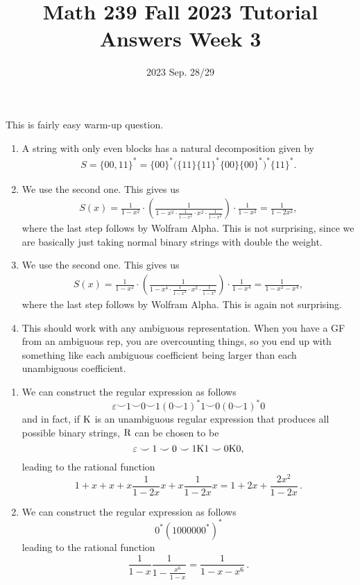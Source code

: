 \title{Math 239 Fall 2023 Tutorial Answers Week 3}

\date{2023 Sep. 28/29}
\maketitle

\begin{enumerate}
     This is fairly easy warm-up question.
    \begin{enumerate}
        \item A string with only even blocks has a natural decomposition given by
        \begin{align*}
            S = \{ 00, 11\}^* = \{ 00\}^* \big( \{ 11\} \{11\}^* \{ 00 \} \{ 00 \}^*  \big)^* \{11\}^*.
        \end{align*}
        \item We use the second one. This gives us
        \begin{align*}
            S(x) = \frac{1}{1-x^2} \cdot \left( \frac{1}{1- x^2 \cdot \frac{1}{1-x^2} \cdot x^2 \cdot \frac{1}{1-x^2}} \right) \cdot \frac{1}{1-x^2} = \frac{1}{1-2x^2},
        \end{align*}
        where the last step follows by Wolfram Alpha. This is not surprising, since we are basically just taking normal binary strings with double the weight.
        \item We use the second one. This gives us
        \begin{align*}
            S(x) = \frac{1}{1-x^2} \cdot \left( \frac{1}{1 - x^4 \cdot \frac{1}{1-x^4} \cdot x^2 \cdot \frac{1}{1-x^2}} \right) \cdot \frac{1}{1-x^4} = \frac{1}{1-x^2-x^4},
        \end{align*}
        where the last step follows by Wolfram Alpha. This is again not surprising.
        \item This should work with any ambiguous representation. When you have a GF from an ambiguous rep, you are overcounting things, so you end up with something like each ambiguous coefficient being larger than each unambiguous coefficient.
    \end{enumerate}

    \newpage
    
    \begin{enumerate}
        \item We can construct the regular expression as follows \[\varepsilon \smile 1 \smile 0\smile 1(0\smile 1)^*1\smile 0(0\smile 1)^*0\] and in fact, if ${\rm K}$ is an unambiguous regular expression that produces all possible binary strings, ${\rm R}$ can be chosen to be \[ \varepsilon \smile 1 \smile 0\smile 1{\rm K}1 \smile 0{\rm K}0,\] leading to the rational function \[1+x+x+ x \frac{1}{1-2x} x+x \frac{1}{1-2x}x=1+2x+\frac{2x^2}{1-2x}\,.\]
        \item We can construct the regular expression as follows \[0^*(1000000^*)^*\] leading to the rational function \[\frac{1}{1-x}\frac{1}{1-\frac{x^6}{1-x}}=\frac{1}{1-x-x^6}\,.\]
    \end{enumerate}
    \newpage
    

\end{enumerate}
